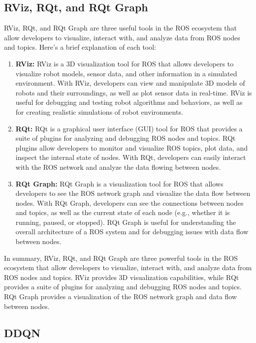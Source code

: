 \documentclass[12pt,oneside]{article}
\begin{document}
\subsection{RViz, RQt, and RQt Graph}\label{rviz_rqt}
RViz, RQt, and RQt Graph are three useful tools in the ROS ecosystem that allow developers to visualize, interact with, and analyze data from ROS nodes and topics. Here's a brief explanation of each tool:
\begin{enumerate}
\item \textbf{RViz:} RViz is a 3D visualization tool for ROS that allows developers to visualize robot models, sensor data, and other information in a simulated environment. With RViz, developers can view and manipulate 3D models of robots and their surroundings, as well as plot sensor data in real-time. RViz is useful for debugging and testing robot algorithms and behaviors, as well as for creating realistic simulations of robot environments.
\item \textbf{RQt:} RQt is a graphical user interface (GUI) tool for ROS that provides a suite of plugins for analyzing and debugging ROS nodes and topics. RQt plugins allow developers to monitor and visualize ROS topics, plot data, and inspect the internal state of nodes. With RQt, developers can easily interact with the ROS network and analyze the data flowing between nodes.
\item \textbf{RQt Graph: }RQt Graph is a visualization tool for ROS that allows developers to see the ROS network graph and visualize the data flow between nodes. With RQt Graph, developers can see the connections between nodes and topics, as well as the current state of each node (e.g., whether it is running, paused, or stopped). RQt Graph is useful for understanding the overall architecture of a ROS system and for debugging issues with data flow between nodes.
\end{enumerate}

In summary, RViz, RQt, and RQt Graph are three powerful tools in the ROS ecosystem that allow developers to visualize, interact with, and analyze data from ROS nodes and topics. RViz provides 3D visualization capabilities, while RQt provides a suite of plugins for analyzing and debugging ROS nodes and topics. RQt Graph provides a visualization of the ROS network graph and data flow between nodes.


\subsection{DDQN}
\end{document}
